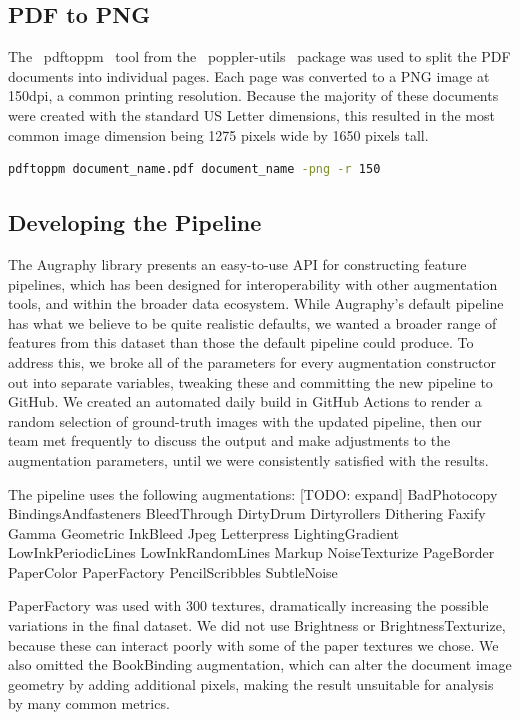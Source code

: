 \documentclass[runningheads]{llncs}
\begin{document}
\subsection{PDF to PNG}
The ~pdftoppm~ tool from the ~poppler-utils~ package was used to split the PDF documents into individual pages.
Each page was converted to a PNG image at 150dpi, a common printing resolution.
Because the majority of these documents were created with the standard US Letter dimensions, this resulted in the most common image dimension being 1275 pixels wide by 1650 pixels tall.

\begin{lstlisting}[language=bash]
  pdftoppm document_name.pdf document_name -png -r 150
\end{lstlisting}

\subsection{Developing the Pipeline}
The Augraphy library presents an easy-to-use API for constructing feature pipelines, which has been designed for interoperability with other augmentation tools, and within the broader data ecosystem.
While Augraphy's default pipeline has what we believe to be quite realistic defaults, we wanted a broader range of features from this dataset than those the default pipeline could produce.
To address this, we broke all of the parameters for every augmentation constructor out into separate variables, tweaking these and committing the new pipeline to GitHub.
We created an automated daily build in GitHub Actions to render a random selection of ground-truth images with the updated pipeline, then our team met frequently to discuss the output and make adjustments to the augmentation parameters, until we were consistently satisfied with the results.

The pipeline uses the following augmentations: [TODO: expand]
BadPhotocopy
BindingsAndfasteners
BleedThrough
DirtyDrum
Dirtyrollers
Dithering
Faxify
Gamma
Geometric
InkBleed
Jpeg
Letterpress
LightingGradient
LowInkPeriodicLines
LowInkRandomLines
Markup
NoiseTexturize
PageBorder
PaperColor
PaperFactory
PencilScribbles
SubtleNoise

PaperFactory was used with 300 textures, dramatically increasing the possible variations in the final dataset. We did not use Brightness or BrightnessTexturize, because these can interact poorly with some of the paper textures we chose. We also omitted the BookBinding augmentation, which can alter the document image geometry by adding additional pixels, making the result unsuitable for analysis by many common metrics.
\end{document}
